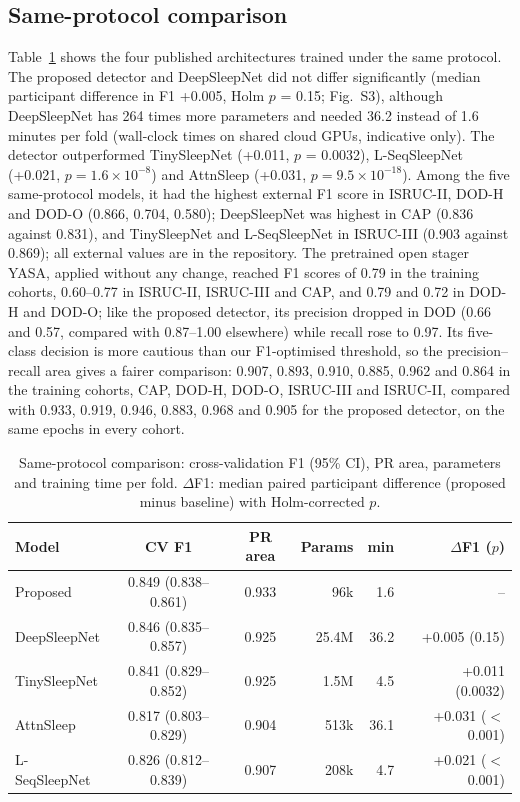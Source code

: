 \subsection{Same-protocol comparison}
Table~\ref{tab:sota} shows the four published architectures trained under the same protocol. The proposed detector and DeepSleepNet did not differ significantly (median participant difference in F1 +0.005, Holm $p$ = 0.15; Fig.~S3), although DeepSleepNet has 264 times more parameters and needed 36.2 instead of 1.6 minutes per fold (wall-clock times on shared cloud GPUs, indicative only). The detector outperformed TinySleepNet (+0.011, $p$ = 0.0032), L-SeqSleepNet (+0.021, $p = 1.6\times10^{-8}$) and AttnSleep (+0.031, $p = 9.5\times10^{-18}$). Among the five same-protocol models, it had the highest external F1 score in ISRUC-II, DOD-H and DOD-O (0.866, 0.704, 0.580); DeepSleepNet was highest in CAP (0.836 against 0.831), and TinySleepNet and L-SeqSleepNet in ISRUC-III (0.903 against 0.869); all external values are in the repository. The pretrained open stager YASA, applied without any change, reached F1 scores of 0.79 in the training cohorts, 0.60--0.77 in ISRUC-II, ISRUC-III and CAP, and 0.79 and 0.72 in DOD-H and DOD-O; like the proposed detector, its precision dropped in DOD (0.66 and 0.57, compared with 0.87--1.00 elsewhere) while recall rose to 0.97. Its five-class decision is more cautious than our F1-optimised threshold, so the precision--recall area gives a fairer comparison: 0.907, 0.893, 0.910, 0.885, 0.962 and 0.864 in the training cohorts, CAP, DOD-H, DOD-O, ISRUC-III and ISRUC-II, compared with 0.933, 0.919, 0.946, 0.883, 0.968 and 0.905 for the proposed detector, on the same epochs in every cohort. %

\begin{table}[!t]
\caption{Same-protocol comparison: cross-validation F1 (95\% CI), PR area, parameters and training time per fold. $\Delta$F1: median paired participant difference (proposed minus baseline) with Holm-corrected $p$.}
\label{tab:sota}
\centering
\setlength{\tabcolsep}{2pt}
\footnotesize
\begin{tabular}{@{}lccrrr@{}}
\toprule
Model & CV F1 & PR area & Params & min & $\Delta$F1 ($p$) \\
\midrule
Proposed & 0.849 (0.838--0.861) & 0.933 & 96k & 1.6 & -- \\ %
DeepSleepNet & 0.846 (0.835--0.857) & 0.925 & 25.4M & 36.2 & +0.005 (0.15) \\
TinySleepNet & 0.841 (0.829--0.852) & 0.925 & 1.5M & 4.5 & +0.011 (0.0032) \\
AttnSleep & 0.817 (0.803--0.829) & 0.904 & 513k & 36.1 & +0.031 ($<$0.001) \\
L-SeqSleepNet & 0.826 (0.812--0.839) & 0.907 & 208k & 4.7 & +0.021 ($<$0.001) \\
\bottomrule
\end{tabular}
\end{table}

